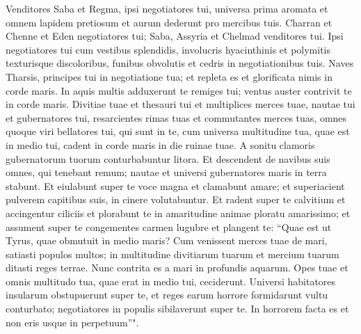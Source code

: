 \begin{biblechapter}
\verse Venditores Saba et Regma, ipsi negotiatores tui, universa prima aromata et omnem lapidem pretiosum et aurum dederunt pro mercibus tuis. 
\verse Charran et Chenne et Eden negotiatores tui; Saba, Assyria et Chelmad venditores tui. 
\verse Ipsi negotiatores tui cum vestibus splendidis, involucris hyacinthinis et polymitis texturisque discoloribus, funibus obvolutis et cedris in negotiationibus tuis. 
\verse Naves Tharsis, principes tui in negotiatione tua; et repleta es et glorificata nimis in corde maris. 
\verse In aquis multis adduxerunt te remiges tui; ventus auster contrivit te in corde maris. 
\verse Divitiae tuae et thesauri tui et multiplices merces tuae, nautae tui et gubernatores tui, resarcientes rimas tuas et commutantes merces tuas, omnes quoque viri bellatores tui, qui sunt in te, cum universa multitudine tua, quae est in medio tui, cadent in corde maris in die ruinae tuae. 
\verse A sonitu clamoris gubernatorum tuorum conturbabuntur litora. 
\verse Et descendent de navibus suis omnes, qui tenebant remum; nautae et universi gubernatores maris in terra stabunt. 
\verse Et eiulabunt super te voce magna et clamabunt amare; et superiacient pulverem capitibus suis, in cinere volutabuntur. 
\verse Et radent super te calvitium et accingentur ciliciis et plorabunt te in amaritudine animae ploratu amarissimo; 
\verse et assument super te congementes carmen lugubre et plangent te: “Quae est ut Tyrus, quae obmutuit in medio maris? 
\verse Cum venissent merces tuae de mari, satiasti populos multos; in multitudine divitiarum tuarum et mercium tuarum ditasti reges terrae. 
\verse Nunc contrita es a mari in profundis aquarum. Opes tuae et omnis multitudo tua, quae erat in medio tui, ceciderunt. 
\verse Universi habitatores insularum obstupuerunt super te, et reges earum horrore formidarunt vultu conturbato; 
\verse negotiatores in populis sibilaverunt super te. In horrorem facta es et non eris usque in perpetuum”". 
\end{biblechapter}

